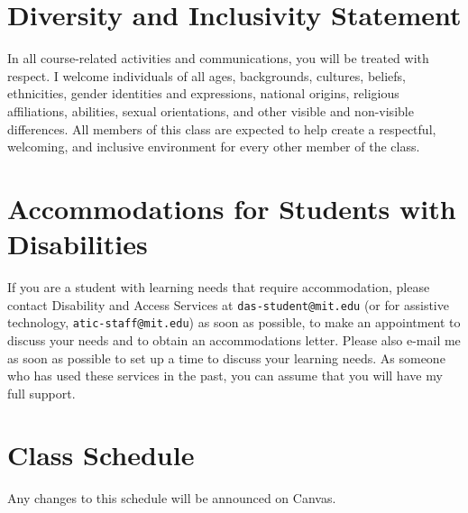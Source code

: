 \documentclass[letterpaper]{inzane_syllabus} %
\begin{document}
\vspace{0.5cm}
\section{Diversity and Inclusivity Statement}

In all course-related activities and communications, you will be treated with respect.
I welcome individuals of all ages, backgrounds, cultures, beliefs, ethnicities, gender identities and expressions, national origins, religious affiliations, abilities, sexual orientations, and other visible and non-visible differences.
All members of this class are expected to help create a respectful, welcoming, and inclusive environment for every other member of the class.

\vspace{0.5cm}
\section{Accommodations for Students with Disabilities}

If you are a student with learning needs that require accommodation, please contact Disability and Access Services at \texttt{das-student@mit.edu} (or for assistive technology, \texttt{atic-staff@mit.edu}) as soon as possible, to make an appointment to discuss your needs and to obtain an accommodations letter.
Please also e-mail me as soon as possible to set up a time to discuss your learning needs.
As someone who has used these services in the past, you can assume that you will have my full support.


\newpage
\makeFullPage
\section{Class Schedule}

Any changes to this schedule will be announced on Canvas.

\vspace{.25in}
\end{document}

